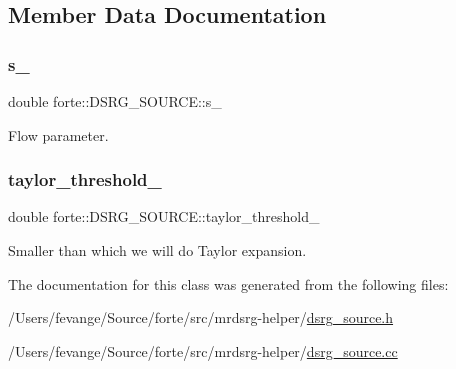 \subsection{Member Data Documentation}
\mbox{\label{classforte_1_1_d_s_r_g___s_o_u_r_c_e_ab83311b0d70b05f301b80bcb9abaf76e}} 
\subsubsection{\texorpdfstring{s\+\_\+}{s\_}}
{\footnotesize\ttfamily double forte\+::\+D\+S\+R\+G\+\_\+\+S\+O\+U\+R\+C\+E\+::s\+\_\+\hspace{0.3cm}{\ttfamily [protected]}}



Flow parameter. 

\mbox{\label{classforte_1_1_d_s_r_g___s_o_u_r_c_e_aaf7ea285612472cefc31e0de08856701}} 
\subsubsection{\texorpdfstring{taylor\+\_\+threshold\+\_\+}{taylor\_threshold\_}}
{\footnotesize\ttfamily double forte\+::\+D\+S\+R\+G\+\_\+\+S\+O\+U\+R\+C\+E\+::taylor\+\_\+threshold\+\_\+\hspace{0.3cm}{\ttfamily [protected]}}



Smaller than which we will do Taylor expansion. 



The documentation for this class was generated from the following files\+:\begin{DoxyCompactItemize}
\item 
/\+Users/fevange/\+Source/forte/src/mrdsrg-\/helper/\mbox{\hyperlink{dsrg__source_8h}{dsrg\+\_\+source.\+h}}\item 
/\+Users/fevange/\+Source/forte/src/mrdsrg-\/helper/\mbox{\hyperlink{dsrg__source_8cc}{dsrg\+\_\+source.\+cc}}\end{DoxyCompactItemize}
